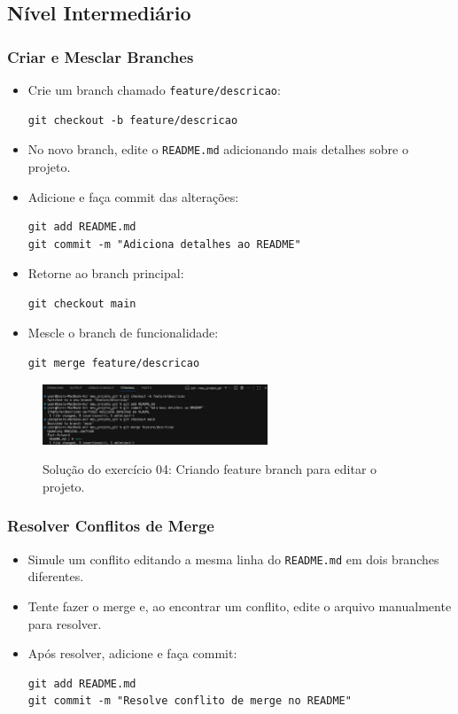 \subsection{Nível Intermediário}

\subsubsection{Criar e Mesclar Branches}
\begin{itemize}
    \item Crie um branch chamado \texttt{feature/descricao}:
    \begin{lstlisting}[style=shellstyle]
git checkout -b feature/descricao
    \end{lstlisting}
    \item No novo branch, edite o \texttt{README.md} adicionando mais detalhes sobre o projeto.
    \item Adicione e faça commit das alterações:
    \begin{lstlisting}[style=shellstyle]
git add README.md
git commit -m "Adiciona detalhes ao README"
    \end{lstlisting}
    \item Retorne ao branch principal:
    \begin{lstlisting}[style=shellstyle]
git checkout main
    \end{lstlisting}
    \item Mescle o branch de funcionalidade:
    \begin{lstlisting}[style=shellstyle]
git merge feature/descricao
    \end{lstlisting}
\end{itemize}

 \begin{figure}[H]
        \centering
        \includegraphics[width=0.6\textwidth]{imgs/tutorial_github/ex04_01.png}
        \label{fig:ex04_01}
        \caption{Solução do exercício 04: Criando feature branch para editar o projeto.}
    \end{figure}

\subsubsection{Resolver Conflitos de Merge}
\begin{itemize}
    \item Simule um conflito editando a mesma linha do \texttt{README.md} em dois branches diferentes.
    \item Tente fazer o merge e, ao encontrar um conflito, edite o arquivo manualmente para resolver.
    \item Após resolver, adicione e faça commit:
    \begin{lstlisting}[style=shellstyle]
git add README.md
git commit -m "Resolve conflito de merge no README"
    \end{lstlisting}
\end{itemize}

